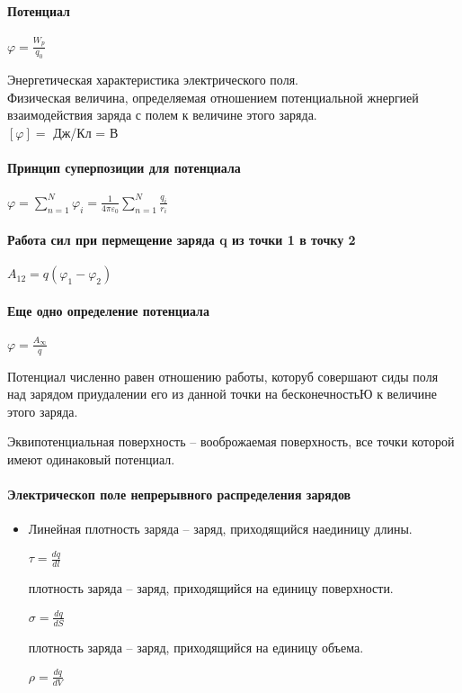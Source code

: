 \documentclass[a4paper]{article}
\begin{document}
\paragraph{Потенциал}
$\varphi = \frac{W_p}{q_0}$ 
\par Энергетическая характеристика электрического поля.
\\ Физическая величина, определяемая отношением потенциальной жнергией взаимодействия заряда с полем к величине этого заряда.
\\ $[\varphi] =$ Дж/Кл = В
\paragraph{Принцип суперпозиции для потенциала}
\begin{center}
  
$\varphi = \sum_{n=1}^{N} \varphi_i = \frac{1}{4\pi \varepsilon_0}\sum_{n=1}^{N} \frac{q_i}{r_i}$
\end{center}
 
\paragraph{Работа сил при пермещение заряда q из точки 1 в точку 2}
\begin{center}
$A_{12} = q(\varphi_1 - \varphi_2)$
\end{center}
\paragraph{Еще одно определение потенциала}
$\varphi = \frac{A_{\infty}}{q}$ 
\par Потенциал численно равен отношению работы, которуб совершают сиды поля над зарядом приудалении его из данной точки на бесконечностьЮ к величине этого заряда.

\par Эквипотенциальная поверхность -- вооброжаемая поверхность, все точки которой имеют одинаковый потенциал.
\paragraph{Электрическоп поле непрерывного распределения зарядов}
\begin{itemize}
  \item Линейная плотность заряда -- заряд, приходящийся наединицу длины.
    \begin{center}
      $\tau = \frac{dq}{dl}$
    \end{center}
   плотность заряда -- заряд, приходящийся на единицу поверхности.
  \begin{center}
    $\sigma = \frac{dq}{dS}$
  \end{center}
   плотность заряда -- заряд, приходящийся на единицу объема.
  \begin{center}
    $\rho = \frac{dq}{dV}$
  \end{center}
\end{itemize}
\end{document}
